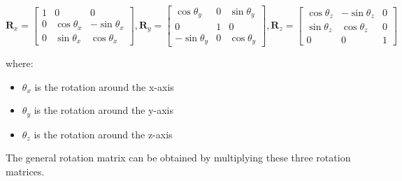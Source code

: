 \begin{equation}
\mathbf{R}_{x}=\left[\begin{array}{ccc}
{1} & {0} & {0} \\
{0} & {\cos \theta_{x}} & {-\sin \theta_{x}} \\
{0} & {\sin \theta_{x}} & {\cos \theta_{x}}
\end{array}\right], \mathbf{R}_{y}=\left[\begin{array}{ccc}
{\cos \theta_{y}} & {0} & {\sin \theta_{y}} \\
{0} & {1} & {0} \\
{-\sin \theta_{y}} & {0} & {\cos \theta_{y}}
\end{array}\right], \mathbf{R}_{z}=\left[\begin{array}{ccc}
{\cos \theta_{z}} & {-\sin \theta_{z}} & {0} \\
{\sin \theta_{z}} & {\cos \theta_{z}} & {0} \\
{0} & {0} & {1}
\end{array}\right]
\end{equation}

\newpage
where:
\begin{itemize}
    \item $\theta_{x}$ is the rotation around the x-axis
    \item $\theta_{y}$ is the rotation around the y-axis
    \item $\theta_{z}$ is the rotation around the z-axis
\end{itemize}

The general rotation matrix can be obtained by multiplying these three rotation matrices.

